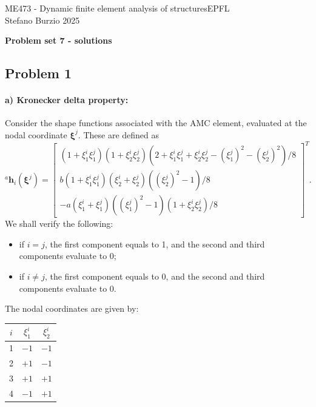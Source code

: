 \documentclass[12pt]{article}
\begin{document}
\noindent ME473 - Dynamic finite element analysis of structures\hfill EPFL\\
Stefano Burzio \hfill 2025\\
\vspace{0.3cm}

\hspace*{\fill}\textbf{\Large Problem set 7 - solutions}\hspace*{\fill}

\hrulefill

\subsection*{Problem 1}
\paragraph{a) Kronecker delta property:} Consider the shape functions associated with the AMC element, evaluated at the nodal coordinate $\boldsymbol{\xi}^j$. These are defined as
\[
    {}^a\mathbf{h}_i(\boldsymbol{\xi}^j) = \begin{bmatrix}
        (1 + \xi_1^i \xi_1^j)(1 + \xi_2^i \xi_2^j)\left(2 + \xi_1^i \xi_1^j + \xi_2^i \xi_2^j - (\xi_1^j)^2 - (\xi_2^j)^2\right)/8 \\
        b(1 + \xi_1^i \xi_1^j)(\xi_2^i + \xi_2^j)((\xi_2^j)^2 - 1)/8                                                               \\
        -a(\xi_1^i + \xi_1^j)((\xi_1^j)^2 - 1)(1 + \xi_2^i \xi_2^j)/8
    \end{bmatrix}^T.
\]
We shall verify the following:
\begin{itemize}
    \item if \(i = j\), the first component equals to 1, and the second and third components evaluate to 0;
    \item if \(i \neq j\), the first component equals to 0, and the second and third components evaluate to 0.
\end{itemize}
The nodal coordinates are given by:
\begin{center}
    \begin{tabular}{c|cc}
        $i$ & $\xi_1^i$ & $\xi_2^i$ \\\hline
        1   & $-1$      & $-1$      \\
        2   & $+1$      & $-1$      \\
        3   & $+1$      & $+1$      \\
        4   & $-1$      & $+1$
    \end{tabular}
\end{center}
\end{document}
